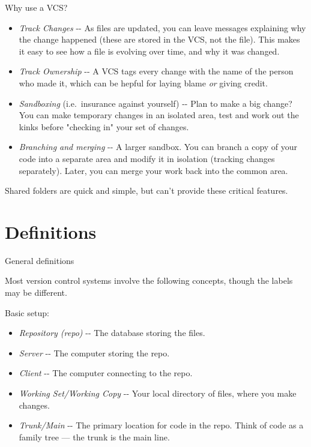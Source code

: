 \documentclass[aspectratio=169]{beamer}
\begin{document}
\begin{frame}{Why use a VCS?}

\begin{itemize}
\item
  \emph{Track Changes} -\/- As files are updated, you can leave messages
  explaining why the change happened (these are stored in the VCS, not
  the file). This makes it easy to see how a file is evolving over time,
  and why it was changed.
\item
  \emph{Track Ownership} -\/- A VCS tags every change with the name of
  the person who made it, which can be hepful for laying blame \emph{or}
  giving credit.
\item
  \emph{Sandboxing} (i.e.~insurance against yourself) -\/- Plan to make
  a big change? You can make temporary changes in an isolated area, test
  and work out the kinks before "checking in" your set of changes.
\item
  \emph{Branching and merging} -\/- A larger sandbox. You can branch a
  copy of your code into a separate area and modify it in isolation
  (tracking changes separately). Later, you can merge your work back
  into the common area.
\end{itemize}

Shared folders are quick and simple, but can't provide these critical
features.

\end{frame}

\section{Definitions}

\begin{frame}{General definitions}

Most version control systems involve the following concepts, though the
labels may be different.

Basic setup:

\begin{itemize}
\item
  \emph{Repository (repo)} -\/- The database storing the files.
\item
  \emph{Server} -\/- The computer storing the repo.
\item
  \emph{Client} -\/- The computer connecting to the repo.
\item
  \emph{Working Set/Working Copy} -\/- Your local directory of files,
  where you make changes.
\item
  \emph{Trunk/Main} -\/- The primary location for code in the repo.
  Think of code as a family tree --- the trunk is the main line.
\end{itemize}

\end{frame}
\end{document}
